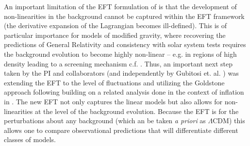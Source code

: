 \documentclass[useAMS,12pt]{article}
\begin{document}
An important limitation of the EFT formulation of \cite{Park:2010cw} is that the development of non-linearities in the background cannot be captured within the EFT framework (the derivative expansion of the Lagrangian becomes ill-defined).  This is of particular importance for models of modified gravity, where recovering the predictions of General Relativity and consistency with solar system tests requires the background evolution to become highly non-linear -- e.g. in regions of high density leading to a screening mechanism c.f. \cite{Khoury:2003aq,Jain:2010ka,Hinterbichler:2010es}.  Thus, an important next step taken by the PI and collaborators \cite{Bloomfield:2012ff} (and independently by Gubitosi et. al. \cite{Gubitosi:2012hu}) was extending the EFT to the level of fluctuations and utilizing the Goldstone approach following building on a related analysis done in the context of inflation in \cite{Cheung:2007st}. The new EFT not only captures the linear models but also allows for non-linearities at the level of the background evolution.  Because the EFT is for the perturbations about any background (which an be taken {\em a priori} as $\Lambda$CDM) this allows one to compare observational predictions that will differentiate different classes of models.
\\
\end{document}
